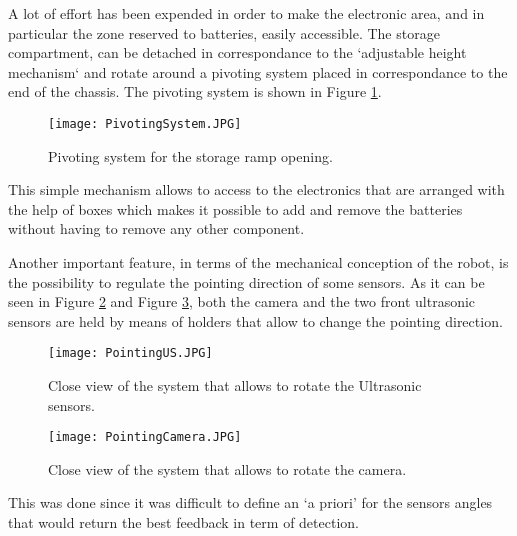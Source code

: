 A lot of effort has been expended in order to make the electronic area, and in particular the zone reserved to batteries, easily accessible.
The storage compartment, can be detached in correspondance to the `adjustable height mechanism` and rotate around a pivoting system placed in correspondance to the end of the chassis.
The pivoting system is shown in Figure \ref{fig:PivotingSystem}.

\begin{figure}[H]
 \centering
 \texttt{[image: PivotingSystem.JPG]}
 \caption{Pivoting system for the storage ramp opening.}
\label{fig:PivotingSystem}
\end{figure}

This simple mechanism allows to access to the electronics that are arranged with the help of boxes which makes it possible to add and remove the batteries without having to remove any other component.

Another important feature, in terms of the mechanical conception of the robot, is the possibility to regulate the pointing direction of some sensors.
As it can be seen in Figure \ref{fig:PointingUS} and Figure \ref{fig:PointingCamera}, both the camera and the two front ultrasonic sensors are held by means of holders that allow to change the pointing direction.

\begin{figure}[H]
 \centering
 \texttt{[image: PointingUS.JPG]}
 \caption{Close view of the system that allows to rotate the Ultrasonic sensors.}
\label{fig:PointingUS}
\end{figure}

\begin{figure}[H]
 \centering
 \texttt{[image: PointingCamera.JPG]}
 \caption{Close view of the system that allows to rotate the camera.}
\label{fig:PointingCamera}
\end{figure}

This was done since it was difficult to define an `a priori' for the sensors angles  that would return the best feedback in term of detection.

